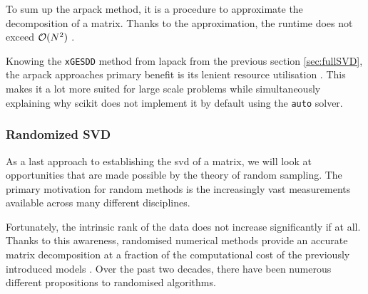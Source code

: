To sum up the \acrshort{arpack} method, it is a procedure to approximate the decomposition of a matrix.
Thanks to the approximation, the runtime does not exceed $\mathcal{O}(N^2)$ \cite{brunton2019data, wright2001large}.

Knowing the \texttt{xGESDD} method from \acrshort{lapack} from the previous section \ref{sec:fullSVD}, the \acrshort{arpack} approaches primary benefit is its lenient resource utilisation \cite{anderson1999lapack}.
This makes it a lot more suited for large scale problems while simultaneously explaining why \gls{scikit} does not implement it by default using the \texttt{auto} solver.

\vspace*{20mm}


\clearpage


\subsubsection{Randomized SVD}


As a last approach to establishing the \acrlong{svd} of a matrix, we will look at opportunities that are made possible by the theory of random sampling\cite{brunton2019data}. 
The primary motivation for random methods is the increasingly vast measurements available across many different disciplines.

Fortunately, the intrinsic rank of the data does not increase significantly if at all.
Thanks to this awareness, randomised numerical methods provide an accurate matrix decomposition at a fraction of the computational cost of the previously introduced models \cite{brunton2019data}.
Over the past two decades, there have been numerous different propositions to randomised algorithms.
\medskip

